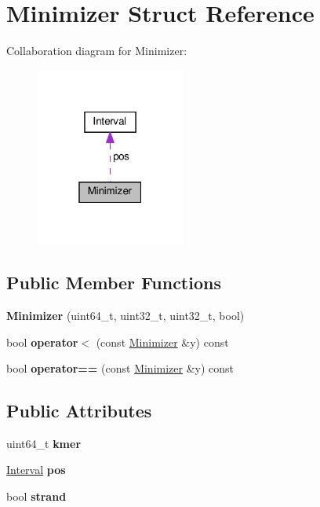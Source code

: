 \hypertarget{structMinimizer}{}\section{Minimizer Struct Reference}
\label{structMinimizer}


Collaboration diagram for Minimizer\+:\nopagebreak
\begin{figure}[H]
\begin{center}
\leavevmode
\includegraphics[width=139pt]{structMinimizer__coll__graph}
\end{center}
\end{figure}
\subsection*{Public Member Functions}
\begin{DoxyCompactItemize}
\item 
\mbox{\label{structMinimizer_a9af8fbb16263bf9b0f1ca04db4e1aead}} 
{\bfseries Minimizer} (uint64\+\_\+t, uint32\+\_\+t, uint32\+\_\+t, bool)
\item 
\mbox{\label{structMinimizer_a59a496028328f1dc79f76a4b9417bfde}} 
bool {\bfseries operator$<$} (const \hyperlink{structMinimizer}{Minimizer} \&y) const
\item 
\mbox{\label{structMinimizer_a4a7c2e2df1f20e6a8ed8fb08be44c4f1}} 
bool {\bfseries operator==} (const \hyperlink{structMinimizer}{Minimizer} \&y) const
\end{DoxyCompactItemize}
\subsection*{Public Attributes}
\begin{DoxyCompactItemize}
\item 
\mbox{\label{structMinimizer_a5a1897a6ab2a57f299cacd201b5488ac}} 
uint64\+\_\+t {\bfseries kmer}
\item 
\mbox{\label{structMinimizer_a4096a676386cd7176bda788b2651986b}} 
\hyperlink{structInterval}{Interval} {\bfseries pos}
\item 
\mbox{\label{structMinimizer_a1f98393ca75068179f896cb96073d659}} 
bool {\bfseries strand}
\end{DoxyCompactItemize}
